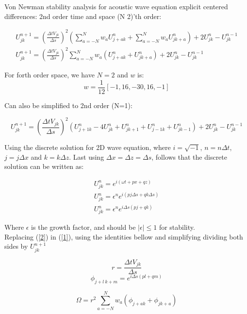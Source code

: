 \documentclass[legalpaper, 12pt]{article}
\begin{document}
Von Newman stability analysis for acoustic wave equation explicit centered differences: 2nd order time and space (N 2)'th order:


\begin{multline}
U_{jk}^{n+1}  =  \left( \frac{\Delta t  V_{jk} }{\Delta s} \right) ^2 \left(  \sum_{a=-N}^N w_a U_{j+a k}^n + \sum_{a=-N}^N w_a U_{j k+a}^n \right) + 2 U_{jk}^{n} - U_{jk}^{n-1}  \\
U_{jk}^{n+1}  =  \left( \frac{\Delta t  V_{jk}}{\Delta s} \right) ^2  \sum_{a=-N}^N  w_a \left( U_{j+a k}^n + U_{j k+a}^n \right) + 2 U_{jk}^{n} - U_{jk}^{n-1} \label{1}
\end{multline}

For forth order space, we have $N=2$ and $w$ is:
$$ w = \frac{1}{12} [-1, 16, -30, 16, -1] $$

Can also be simplified to 2nd order (N=1):

\begin{equation}
U_{jk}^{n+1}  =  \left( \frac{\Delta t  V_{jk}}{\Delta s} \right) ^2 \left(  U_{j+1k}^n - 4 U_{jk}^n + U_{jk+1}^n + U_{j-1k}^n + U_{jk-1}^n  \right) + 2 U_{jk}^{n} - U_{jk}^{n-1} \nonumber
\end{equation}

Using the discrete solution for 2D wave equation, where $ i = \sqrt{-1} $, $ n = n \Delta t $, $ j = j \Delta x $ and $ k = k \Delta z $. Last using $ \Delta x = \Delta z = \Delta s $, follows that the discrete solution can be written as:

\begin{eqnarray}
U_{jk}^n = e^{i \left( \omega t + px + qz \right)} \nonumber \\
U_{jk}^n = \epsilon^n e^{i \left( pj\Delta s + qk\Delta s \right)}  \nonumber \\
U_{jk}^n = \epsilon^n e^{i \Delta s \left( pj + qk \right)}  \label{2}
\end{eqnarray}

Where $\epsilon $ is the growth factor, and should be $ |\epsilon| \leq 1$ for stability. \\

Replacing (\ref{2}) in (\ref{1}), using the identities bellow and simplifying dividing both sides by $ U_{jk}^{n+1} $

$$ r = \frac{\Delta t  V_{jk}}{\Delta s} $$
$$ \phi_{j+l\ k+m} = e^{i \Delta s \left( pl+qm \right)} $$

\begin{equation}
\Omega = r^2 \sum_{a=-N}^N  w_a \left( \phi_{j+a k} + \phi_{j k+a}  \right) \label{3}
\end{equation}
\end{document}
